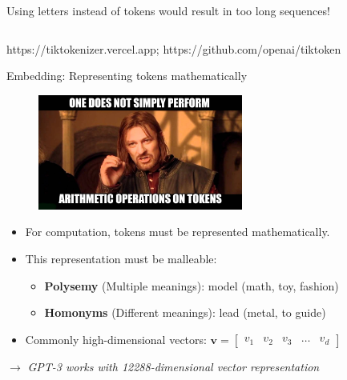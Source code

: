 \documentclass[10pt]{beamer}
\newcommand{\creditleft}[1]{{\par \raggedright \scriptsize \mdseries \color{mDarkBrown} #1 \par}}
\newcommand{\feature}[1]{{\color{scLime} \textbf{#1}}}
\newcommand{\remark}[1]{{\par \color{scGrape} \ensuremath{\rightarrow} \emph{#1}}}
\begin{document}
\begin{frame}{Using letters instead of tokens would result in too long sequences!}
\begin{columns}[T,onlytextwidth]
\begin{itemize}
		\end{itemize}
	\end{columns}
		\creditleft{https://tiktokenizer.vercel.app;  https://github.com/openai/tiktoken}
\end{frame}

\begin{frame}{Embedding: Representing tokens mathematically}
	\begin{figure}
		\includegraphics[width=0.6\textwidth]{figures/OneDoesNotSimply.jpg}
	\end{figure}
		\begin{itemize}
			\item For computation, tokens must be represented mathematically.
			\item This representation must be malleable:
			 \begin{itemize}
				\item \feature{Polysemy} (Multiple meanings): model (math, toy, fashion)
				\item \feature{Homonyms} (Different meanings): lead (metal, to guide)
			\end{itemize}
			\item Commonly high-dimensional vectors: $\mathbf{v} =
			\begin{bmatrix}
				v_1 & v_2 & v_3 & \dots & v_d
			\end{bmatrix}$
		\end{itemize}
		 \vspace{0.2cm} \par \remark{GPT-3 works with 12288-dimensional vector representation}
\end{frame}
\end{document}
